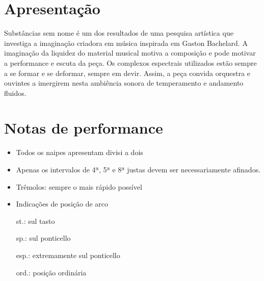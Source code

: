 \documentclass{homework}
\author{Davi Raubach Tuchtenhagen}
\date{\today}
\title{}
\begin{document}
\chapter{Apresentação}
\label{sec:org3af9e28}
Substâncias sem nome é um dos resultados de uma pesquisa artística que investiga a imaginação criadora em música inspirada em Gaston Bachelard. A imaginação da liquidez do material musical motiva a composição e pode motivar a performance e escuta da peça. Os complexos espectrais utilizados estão sempre a se formar e se deformar, sempre em devir. Assim, a peça convida orquestra e ouvintes a imergirem nesta ambiência sonora de temperamento e andamento fluidos.

\chapter{Notas de performance}
\label{sec:org04f81d8}

\begin{itemize}
\item Todos os naipes apresentam divisi a dois

\item Apenas os intervalos de 4ª, 5ª e 8ª justas devem ser necessariamente afinados.

\item Trêmolos: sempre o mais rápido possível

\item Indicações de posição de arco

st.: sul tasto

sp.: sul ponticello

esp.: extremamente sul ponticello

ord.: posição ordinária
\end{itemize}
\end{document}
